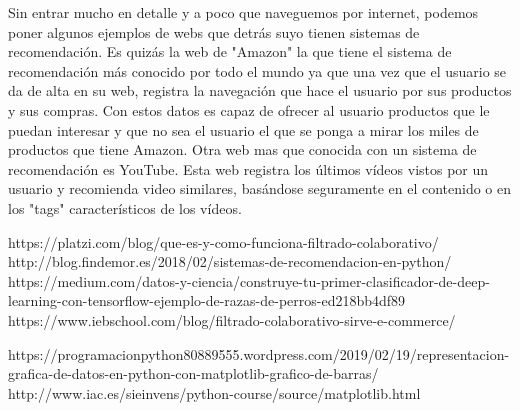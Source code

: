 \documentclass[preprint,12pt]{elsarticle}
\begin{document}
Sin entrar mucho en detalle y a poco que naveguemos por internet, podemos poner algunos ejemplos de webs que detrás suyo tienen sistemas de recomendación. Es quizás la web de "Amazon" la que tiene el sistema de recomendación más conocido por todo el mundo ya que una vez que el usuario se da de alta en su web, registra la navegación que hace el usuario por sus productos y sus compras. Con estos datos es capaz de ofrecer al usuario productos que le puedan interesar y que no sea el usuario el que se ponga a mirar los miles de productos que tiene Amazon. Otra web mas que conocida con un sistema de recomendación es YouTube. Esta web registra los últimos vídeos vistos por un usuario y recomienda video similares, basándose seguramente en el contenido o en los "tags" característicos de los vídeos. 

	

	
	
	\newpage
	
	   \begin{thebibliography}{0}
 		\bibitem{} https://platzi.com/blog/que-es-y-como-funciona-filtrado-colaborativo/
              \bibitem{} http://blog.findemor.es/2018/02/sistemas-de-recomendacion-en-python/
	    \bibitem{} https://medium.com/datos-y-ciencia/construye-tu-primer-clasificador-de-deep-learning-con-tensorflow-ejemplo-de-razas-de-perros-ed218bb4df89	
\bibitem{} https://www.iebschool.com/blog/filtrado-colaborativo-sirve-e-commerce/
 	   
                 
                  \bibitem{} https://programacionpython80889555.wordpress.com/2019/02/19/representacion-grafica-de-datos-en-python-con-matplotlib-grafico-de-barras/
                  \bibitem{} http://www.iac.es/sieinvens/python-course/source/matplotlib.html
                    
                  

         \end{thebibliography}
	
\end{document}
